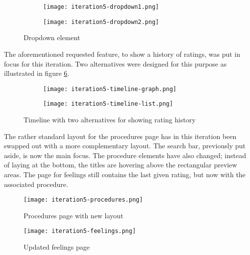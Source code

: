 \begin{figure}
    \centering
    \begin{subfigure}[t]{0.45\textwidth}
        \centering
        \vspace{0pt}
        \texttt{[image: iteration5-dropdown1.png]}
        \label{fig:i5-dropdown1}
    \end{subfigure}
    \begin{subfigure}[t]{0.45\textwidth}
        \centering
        \vspace{0pt}
        \texttt{[image: iteration5-dropdown2.png]}
        \label{fig:i5-dropdown2}
    \end{subfigure}
    \caption{Dropdown element}
    \label{fig:i5-timeline}
\end{figure}


The aforementioned requested feature, to show a history of ratings, was put in focus for this iteration. Two alternatives were designed for this purpose as illustrated in figure \ref{fig:i5-timeline}.

\begin{figure}
    \centering
    \begin{subfigure}{0.45\textwidth}
        \centering
        \texttt{[image: iteration5-timeline-graph.png]}
        \label{fig:i5-timeline-graph}
    \end{subfigure}
    \begin{subfigure}{0.45\textwidth}
        \centering
        \texttt{[image: iteration5-timeline-list.png]}
        \label{fig:i5-timeline-list}
    \end{subfigure}
    \caption{Timeline with two alternatives for showing rating history}
    \label{fig:i5-timeline}
\end{figure}

The rather standard layout for the procedures page has in this iteration been swapped out with a more complementary layout. The search bar, previously put aside, is now the main focus. The procedure elements have also changed; instead of laying at the bottom, the titles are hovering above the rectangular preview areas. The page for feelings still contains the last given rating, but now with the associated procedure.

\begin{figure}
    \centering
    \begin{minipage}{0.45\textwidth}
        \centering
        \texttt{[image: iteration5-procedures.png]}
        \caption{Procedures page with new layout}
        \label{fig:i5-procedures}
    \end{minipage}
    \begin{minipage}{0.45\textwidth}
        \centering
        \texttt{[image: iteration5-feelings.png]}
        \caption{Updated feelings page}
        \label{fig:i5-feelings}
    \end{minipage}
\end{figure}

